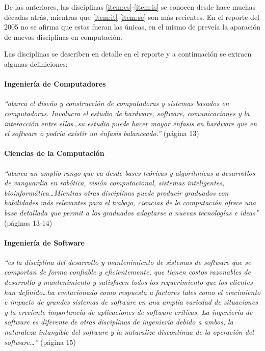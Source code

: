 De las anteriores, las disciplinas \ref{item:cs}-\ref{item:is} se conocen desde hace muchas décadas atrás, mientras que \ref{item:it}-\ref{item:se} son más recientes. En el reporte del 2005 no se afirma que estas fueran las únicas, en el mismo de preveía la aparación de nuevas disciplinas en computación. 

Las disciplinas se describen en detalle en el reporte y a continuación se extraen algunas definiciones:

\paragraph{Ingeniería de Computadores} \emph{``abarca el diseño y construcción de computadoras y sistemas basados en computadoras. Involucra el estudio de hardware, software, comunicaciones y la interacción entre ellos\ldots su estudio puede hacer mayor énfasis en hardware que en el software o podría existir un énfasis balanceado.''} (página 13)

\paragraph{Ciencias de la Computación} \emph{``abarca un amplio rango que va desde bases teóricas y algorítmicas a desarrollos de vanguardia en robótica, visión computacional, sistemas inteligentes, bioinformática\ldots Mientras otras disciplinas puede producir graduados con habilidades más relevantes para el trabajo, ciencias de la computación ofrece una base detallada que permit a los graduados adaptarse a nuevas tecnologías e ideas''} (páginas 13-14)

\paragraph{Ingeniería de Software} \emph{``es la disciplina del desarrollo y mantenimiento de sistemas de software que se comportan de forma confiable y eficientemente, que tienen costos razonables de desarrollo y mantenimiento y satisfacen todos los requerimiento que los clientes han definido\ldots ha evolucionado como respuesta a factores tales como el crecimiento e impacto de grandes sistemas de software en una amplia variedad de situaciones y la creciente importancia de aplicaciones de software críticas. La ingeniería de software es diferente de otras disciplinas de ingeniería debido a ambos, la naturaleza intangible del software y la naturalize discontinua de la operación del software\ldots''} (página 15)


